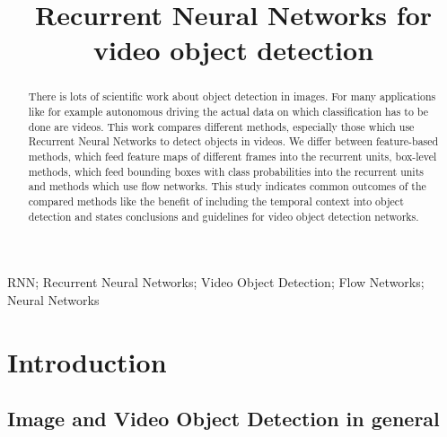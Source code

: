 \documentclass[conference]{IEEEtran}
\begin{document}
\title{Recurrent Neural Networks for video object detection}

\author{
\and
{}
}

\maketitle

\begin{abstract}
There is lots of scientific work about object detection in images. For many applications like for example autonomous driving the actual data on which classification has to be done are videos. This work compares different methods, especially those which use Recurrent Neural Networks to detect objects in videos. We differ between feature-based methods, which feed feature maps of different frames into the recurrent units, box-level methods, which feed bounding boxes with class probabilities into the recurrent units and methods which use flow networks. This study indicates common outcomes of the compared methods like the benefit of including the temporal context into object detection and states conclusions and guidelines for video object detection networks. 
\end{abstract}

\begin{IEEEkeywords}
RNN; Recurrent Neural Networks; Video Object Detection; Flow Networks; Neural Networks
\end{IEEEkeywords}

\section{Introduction}

\subsection{Image and Video Object Detection in general}
\end{document}
